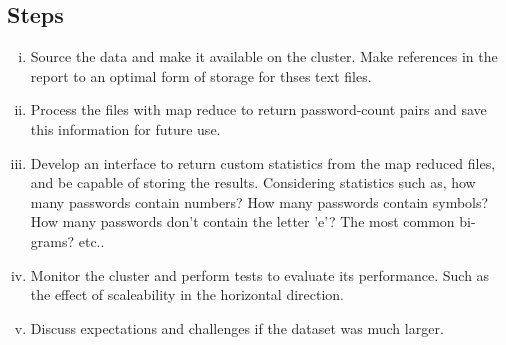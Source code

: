 \documentclass{article}
\begin{document}
\begin{multicols}{2}
{\section*{Steps}

\begin{enumerate}[(i)]

\item Source the data and make it available on the cluster. Make references in the report to an optimal form of storage for thses text files.
\item Process the files with map reduce to return password-count pairs and save this information for future use.
\item Develop an interface to return custom statistics from the map reduced files, and be capable of storing the results. Considering statistics such as, how many passwords contain numbers? How many passwords contain symbols? How many passwords don't contain the letter 'e'? The most common bi-grams? etc.. 
\item Monitor the cluster and perform tests to evaluate its performance. Such as the effect of scaleability in the horizontal direction.
\item Discuss expectations and challenges if the dataset was much larger.

\end{enumerate}
}



\printbibliography

\end{multicols}
\end{document}
